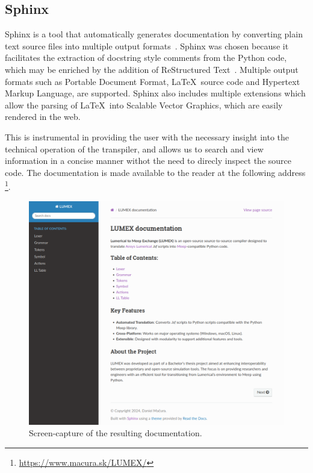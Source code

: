 \subsection{Sphinx}
Sphinx is a tool that automatically generates documentation by converting plain text source files into multiple output formats~\cite{sphinx_quickstart}. Sphinx was chosen because it facilitates the extraction of docstring style comments from the Python code, which may be enriched by the addition of ReStructured Text~\cite{docutils_rst}. Multiple output formats such as Portable Document Format, \LaTeX \ source code and Hypertext Markup Language, are supported. Sphinx also includes multiple extensions which allow the parsing of \LaTeX \ into Scalable Vector Graphics, which are easily rendered in the web.

This is instrumental in providing the user with the necessary insight into the technical operation of the transpiler, and allows us to search and view information in a concise manner withot the need to direcly inspect the source code. The documentation is made available to the reader at the following address \footnote{\url{https://www.macura.sk/LUMEX/}}.

\begin{figure}[H]

  \label{fig:shpinx}
  \centering
  \includegraphics[width=\textwidth]{obrazky-figures/sphinx-lumex.png}
  \caption{Screen-capture of the resulting documentation.}
\end{figure}


